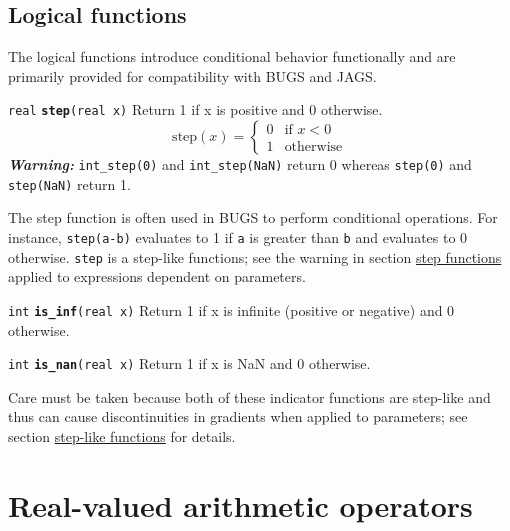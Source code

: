 \documentclass[
  10pt,
]{book}
\begin{document}
\hypertarget{logical-functions-1}{%
\subsection{Logical functions}\label{logical-functions-1}}

The logical functions introduce conditional behavior functionally and
are primarily provided for compatibility with BUGS and JAGS.


\texttt{real} \textbf{\texttt{step}}\texttt{(real\ x)}\newline
Return 1 if x is positive and 0 otherwise. \[ \text{step}(x) =
\begin{cases} 0 & \text{if } x < 0 \\ 1 & \text{otherwise} \end{cases}
\] \emph{\textbf{Warning:}} \texttt{int\_step(0)} and \texttt{int\_step(NaN)} return 0 whereas
\texttt{step(0)} and \texttt{step(NaN)} return 1.

The step function is often used in BUGS to perform conditional
operations. For instance, \texttt{step(a-b)} evaluates to 1 if \texttt{a} is
greater than \texttt{b} and evaluates to 0 otherwise. \texttt{step} is a step-like
functions; see the warning in section \protect\hyperlink{step-functions}{step functions} applied to
expressions dependent on parameters.


\texttt{int} \textbf{\texttt{is\_inf}}\texttt{(real\ x)}\newline
Return 1 if x is infinite (positive or negative) and 0 otherwise.


\texttt{int} \textbf{\texttt{is\_nan}}\texttt{(real\ x)}\newline
Return 1 if x is NaN and 0 otherwise.

Care must be taken because both of these indicator functions are
step-like and thus can cause discontinuities in gradients when applied
to parameters; see section \protect\hyperlink{step-functions}{step-like functions} for details.

\hypertarget{real-valued-arithmetic-operators}{%
\section{Real-valued arithmetic operators}\label{real-valued-arithmetic-operators}}
\end{document}
